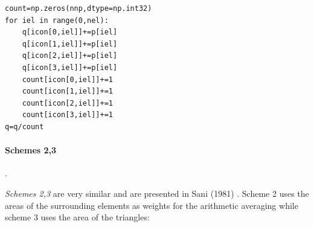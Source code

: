 \begin{lstlisting}
count=np.zeros(nnp,dtype=np.int32)  
for iel in range(0,nel):
    q[icon[0,iel]]+=p[iel]
    q[icon[1,iel]]+=p[iel]
    q[icon[2,iel]]+=p[iel]
    q[icon[3,iel]]+=p[iel]
    count[icon[0,iel]]+=1
    count[icon[1,iel]]+=1
    count[icon[2,iel]]+=1
    count[icon[3,iel]]+=1
q=q/count
\end{lstlisting}



\paragraph{Schemes 2,3}.

{\sl Schemes 2,3} are very similar and are presented in Sani \etal (1981) \cite{sagl81a,sagl81b}.
Scheme 2 uses the areas of the surrounding elements as weights for the arithmetic averaging
while scheme 3 uses the area of the triangles:

